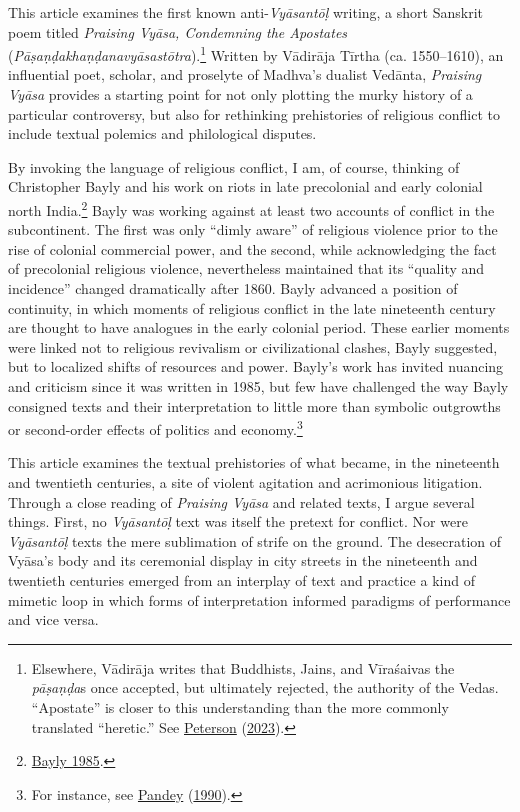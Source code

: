 This article examines the first known anti-\emph{Vyāsantōḷ} writing, a short Sanskrit poem titled \emph{Praising Vyāsa, Condemning the Apostates} (\emph{{Pāṣaṇḍakhaṇḍanavyāsastōtra}}).\footnote{%
Elsewhere, Vādirāja writes that Buddhists, Jains, and Vīraśaivas  \Dash  the \emph{pāṣaṇḍa}s  \Dash  once accepted, but ultimately rejected, the authority of the Vedas. “Apostate” is closer to this understanding than the more commonly translated “heretic.” See \hyperref[Peterson2023]{Peterson} (\hyperref[Peterson2023]{2023}).
}
 Written by Vādirāja Tīrtha (ca. 1550–1610), an influential poet, scholar, and proselyte of Madhva’s dualist Vedānta, \emph{Praising Vyāsa} provides a starting point for not only plotting the murky history of a particular controversy, but also for rethinking prehistories of religious conflict to include textual polemics and philological disputes.


By invoking the language of religious conflict, I am, of course, thinking of Christopher Bayly and his work on riots in late precolonial and early colonial north India.\footnote{%
\hyperref[Bayly1985]{Bayly 1985}.
}
 Bayly was working against at least two accounts of conflict in the subcontinent. The first was only “dimly aware” of religious violence prior to the rise of colonial commercial power, and the second, while acknowledging the fact of precolonial religious violence, nevertheless maintained that its “quality and incidence” changed dramatically after 1860. Bayly advanced a position of continuity, in which moments of religious conflict in the late nineteenth century are thought to have analogues in the early colonial period. These earlier moments were linked not to religious revivalism or civilizational clashes, Bayly suggested, but to localized shifts of resources and power. Bayly’s work has invited nuancing and criticism since it was written in 1985, but few have challenged the way Bayly consigned texts and their interpretation to little more than symbolic outgrowths or second-order effects of politics and economy.\footnote{%
For instance, see \hyperref[Pandey1990]{Pandey} (\hyperref[Pandey1990]{1990}).
}



This article examines the textual prehistories of what became, in the nineteenth and twentieth centuries, a site of violent agitation and acrimonious litigation. Through a close reading of \emph{Praising Vyāsa} and related texts, I argue several things. First, no \emph{Vyāsantōḷ} text was itself the pretext for conflict. Nor were \emph{Vyāsantōḷ} texts the mere sublimation of strife on the ground. The desecration of Vyāsa’s body and its ceremonial display in city streets in the nineteenth and twentieth centuries emerged from an interplay of text and practice  \Dash  a kind of mimetic loop  \Dash  in which forms of interpretation informed paradigms of performance and vice versa.


